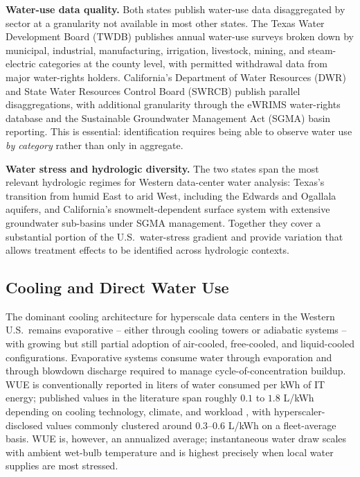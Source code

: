 \documentclass[11pt, letterpaper]{article}
\begin{document}
\textbf{Water-use data quality.} Both states publish water-use data disaggregated by sector at a granularity not available in most other states. The Texas Water Development Board (TWDB) publishes annual water-use surveys broken down by municipal, industrial, manufacturing, irrigation, livestock, mining, and steam-electric categories at the county level, with permitted withdrawal data from major water-rights holders. California's Department of Water Resources (DWR) and State Water Resources Control Board (SWRCB) publish parallel disaggregations, with additional granularity through the eWRIMS water-rights database and the Sustainable Groundwater Management Act (SGMA) basin reporting. This is essential: identification requires being able to observe water use \emph{by category} rather than only in aggregate.

\textbf{Water stress and hydrologic diversity.} The two states span the most relevant hydrologic regimes for Western data-center water analysis: Texas's transition from humid East to arid West, including the Edwards and Ogallala aquifers, and California's snowmelt-dependent surface system with extensive groundwater sub-basins under SGMA management. Together they cover a substantial portion of the U.S.\ water-stress gradient and provide variation that allows treatment effects to be identified across hydrologic contexts.

\subsection{Cooling and Direct Water Use}

The dominant cooling architecture for hyperscale data centers in the Western U.S.\ remains evaporative -- either through cooling towers or adiabatic systems -- with growing but still partial adoption of air-cooled, free-cooled, and liquid-cooled configurations. Evaporative systems consume water through evaporation and through blowdown discharge required to manage cycle-of-concentration buildup. WUE is conventionally reported in liters of water consumed per kWh of IT energy; published values in the literature span roughly $0.1$ to $1.8$ L/kWh depending on cooling technology, climate, and workload \citep{lei2025water,mytton2021data}, with hyperscaler-disclosed values commonly clustered around $0.3$--$0.6$ L/kWh on a fleet-average basis. WUE is, however, an annualized average; instantaneous water draw scales with ambient wet-bulb temperature and is highest precisely when local water supplies are most stressed.
\end{document}
